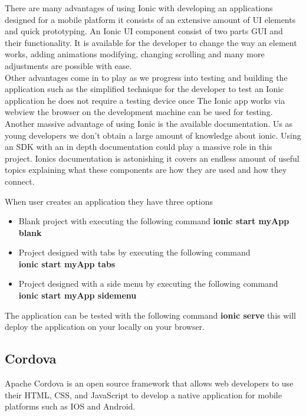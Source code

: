 \documentclass[a4paper,12pt]{report}
\begin{document}
There are many advantages of using Ionic with developing an applications designed for a mobile platform it consists of an extensive amount of UI elements and quick prototyping. An Ionic UI component consist of two parts GUI and their functionality. It is available for the developer to change the way an element works, adding animations modifying, changing scrolling and many more adjustments are possible with ease.\\

Other advantages come in to play as we progress into testing and building the application such as the simplified technique for the developer to test an Ionic application he does not require a testing device once The Ionic app works via webview the browser on the development machine can be used for testing.\\
Another massive advantage of using Ionic is the available documentation. Us as young developers we don't obtain a large amount of knowledge about ionic. Using an SDK with an in depth documentation could play a massive role in this project.
Ionics documentation is astonishing it covers an endless amount of useful topics explaining what these components are how they are used and how they connect.\cite{ionicPros}

When user creates an application they have three options 
\begin{itemize}
    \item Blank project with executing the following command \textbf{ionic start myApp blank}
    \item Project designed with tabs by executing the following command\\ \textbf{ionic start myApp tabs}
    \item Project designed with a side menu by executing the following command\\ \textbf{ionic start myApp sidemenu}
\end{itemize}

The application can be tested with the following command \textbf{ionic serve} this will deploy the application on your locally on your browser.\cite{ionicRun}

\subsection{Cordova}
Apache Cordova is an open source framework that allows web developers to use their HTML, CSS, and JavaScript to develop a native application for mobile platforms such as IOS and Android.\\
\end{document}
